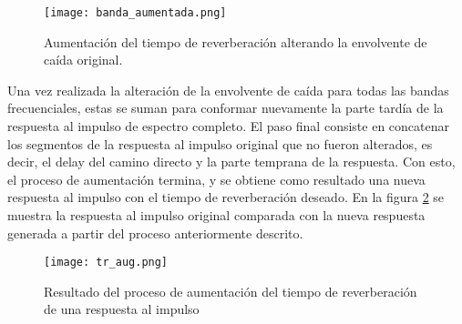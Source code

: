 \begin{figure}[H]
	\centering{}
	\texttt{[image: banda\_aumentada.png]}
	\caption{Aumentación del tiempo de reverberación alterando la envolvente de caída original.}
	\label{fig:banda_aumentada}
\end{figure}

Una vez realizada la alteración de la envolvente de caída para todas las bandas frecuenciales, estas se suman para conformar nuevamente la parte tardía de la respuesta al impulso de espectro completo. El paso final consiste en concatenar los segmentos de la respuesta al impulso original que no fueron alterados, es decir, el delay del camino directo y la parte temprana de la respuesta. Con esto, el proceso de aumentación termina, y se obtiene como resultado una nueva respuesta al impulso con el tiempo de reverberación deseado. En la figura \ref{fig:salida_aumentacion_tr} se muestra la respuesta al impulso original comparada con la nueva respuesta generada a partir del proceso anteriormente descrito. 

\begin{figure}[H]
	\centering{}
	\texttt{[image: tr\_aug.png]}
	\caption{Resultado del proceso de aumentación del tiempo de reverberación de una respuesta al impulso}
	\label{fig:salida_aumentacion_tr}
\end{figure}






